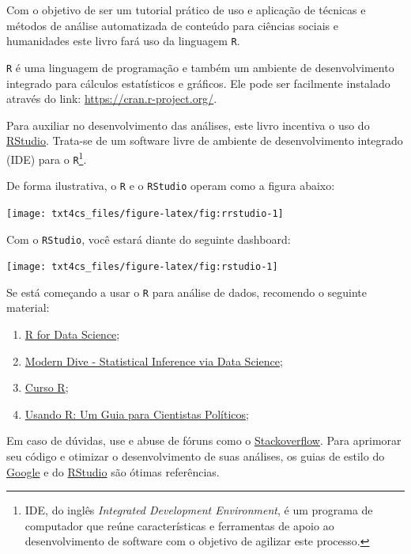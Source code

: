 \documentclass[]{book}
\begin{document}
Com o objetivo de ser um tutorial prático de uso e aplicação de técnicas e métodos de análise automatizada de conteúdo para ciências sociais e humanidades este livro fará uso da linguagem \texttt{R}.

\texttt{R} é uma linguagem de programação e também um ambiente de desenvolvimento integrado
para cálculos estatísticos e gráficos. Ele pode ser facilmente instalado através do link: \url{https://cran.r-project.org/}.

Para auxiliar no desenvolvimento das análises, este livro incentiva o uso do \href{https://www.rstudio.com/}{RStudio}. Trata-se de um software livre de ambiente de desenvolvimento integrado (IDE) para o \texttt{R}\footnote{IDE, do inglês \emph{Integrated Development Environment}, é um programa de computador que reúne características e ferramentas de apoio ao desenvolvimento de software com o objetivo de agilizar este processo.}.

De forma ilustrativa, o \texttt{R} e o \texttt{RStudio} operam como a figura abaixo:

\begin{center}\texttt{[image: txt4cs\_files/figure-latex/fig:rrstudio-1]} \end{center}

Com o \texttt{RStudio}, você estará diante do seguinte dashboard:

\begin{center}\texttt{[image: txt4cs\_files/figure-latex/fig:rstudio-1]} \end{center}

Se está começando a usar o \texttt{R} para análise de dados, recomendo o seguinte material:

\begin{enumerate}
\def\labelenumi{\arabic{enumi}.}
\item
  \href{https://r4ds.had.co.nz/}{R for Data Science};
\item
  \href{https://moderndive.com/index.html}{Modern Dive - Statistical Inference via Data Science};
\item
  \href{http://material.curso-r.com/rbase/}{Curso R};
\item
  \href{http://electionsbr.com/livro/}{Usando R: Um Guia para Cientistas Políticos};
\end{enumerate}

Em caso de dúvidas, use e abuse de fóruns como o \href{https://stackoverflow.com/}{Stackoverflow}. Para aprimorar seu código e otimizar o desenvolvimento de suas análises, os guias de estilo do \href{https://google.github.io/styleguide/Rguide.xml}{Google} e do \href{http://adv-r.had.co.nz/Style.html}{RStudio} são ótimas referências.
\end{document}
